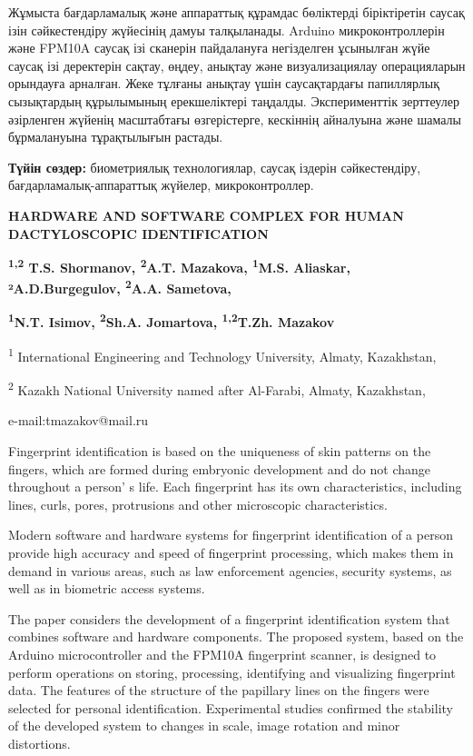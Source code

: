 Жұмыста бағдарламалық және аппараттық құрамдас бөліктерді біріктіретін
саусақ ізін сәйкестендіру жүйесінің дамуы талқыланады. Arduino
микроконтроллерін және FPM10A саусақ ізі сканерін пайдалануға
негізделген ұсынылған жүйе саусақ ізі деректерін сақтау, өңдеу, анықтау
және визуализациялау операцияларын орындауға арналған. Жеке тұлғаны
анықтау үшін саусақтардағы папиллярлық сызықтардың құрылымының
ерекшеліктері таңдалды. Эксперименттік зерттеулер әзірленген жүйенің
масштабтағы өзгерістерге, кескіннің айналуына және шамалы бұрмалануына
тұрақтылығын растады.

{\bfseries Түйін сөздер:} биометриялық технологиялар, саусақ іздерін
сәйкестендіру, \\бағдарламалық-аппараттық жүйелер, микроконтроллер.

\begin{articleheader}
{\bfseries HARDWARE AND SOFTWARE COMPLEX FOR HUMAN DACTYLOSCOPIC
IDENTIFICATION}

{\bfseries \textsuperscript{1,2} T.S. Shormanov, \textsuperscript{2}A.T.
Mazakova, \textsuperscript{1}M.S. Aliaskar, ²A.D.Burgegulov,
\textsuperscript{2}A.A. Sametova,}

{\bfseries \textsuperscript{1}N.T. Isimov, \textsuperscript{2}Sh.A.
Jomartova, \textsuperscript{1,2}T.Zh. Mazakov\textsuperscript{\envelope }}
\end{articleheader}

\begin{affiliation}
\textsuperscript{1} International Engineering and Technology University,
Almaty, Kazakhstan,

\textsuperscript{2} Kazakh National University named after Al-Farabi,
Almaty, Kazakhstan,

e-mail:tmazakov@mail.ru
\end{affiliation}

Fingerprint identification is based on the uniqueness of skin patterns
on the fingers, which are formed during embryonic development and do not
change throughout a person' s life. Each fingerprint has
its own characteristics, including lines, curls, pores, protrusions and
other microscopic characteristics.

Modern software and hardware systems for fingerprint identification of a
person provide high accuracy and speed of fingerprint processing, which
makes them in demand in various areas, such as law enforcement agencies,
security systems, as well as in biometric access systems.

The paper considers the development of a fingerprint identification
system that combines software and hardware components. The proposed
system, based on the Arduino microcontroller and the FPM10A fingerprint
scanner, is designed to perform operations on storing, processing,
identifying and visualizing fingerprint data. The features of the
structure of the papillary lines on the fingers were selected for
personal identification. Experimental studies confirmed the stability of
the developed system to changes in scale, image rotation and minor
distortions.

